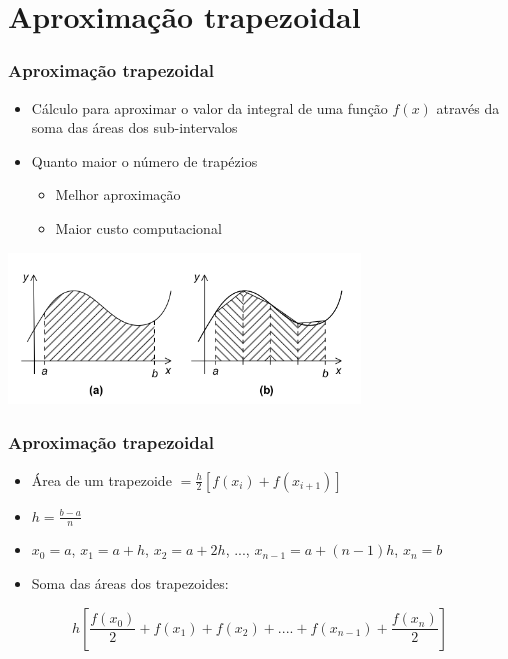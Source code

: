 \documentclass[xcolor={usenames,dvipsnames},12pt,presentation,aspectratio=169]{beamer}
\begin{document}
\section{Aproximação trapezoidal}
\begin{frame}
  \frametitle{Aproximação trapezoidal}
  \begin{itemize}
    \item Cálculo para aproximar o valor da integral de uma função $f(x)$ através da soma das áreas dos sub-intervalos
    \item Quanto maior o número de trapézios
    \begin{itemize}
      \item Melhor aproximação
      \item Maior custo computacional
    \end{itemize}
  \end{itemize}
  \begin{center}
    \includegraphics[width=0.7\textwidth]{trap.png}
    \end{center}  
\end{frame}
\begin{frame}
  \frametitle{Aproximação trapezoidal}
  \begin{itemize}
    \item Área de um trapezoide $= \frac{h}{2}[f(x_i)+f(x_{i+1})]$
    \item $h = \frac{b-a}{n}$
    \item $x_0 = a$, $x_1 = a+h$, $x_2 = a+2h$, ..., $x_{n-1} = a+(n-1)h$, $x_n=b$
    \item Soma das áreas dos trapezoides:
  \end{itemize} 
  \begin{equation*}
    h[\frac{f(x_0)}{2}+f(x_1)+f(x_2)+....+f(x_{n-1})+\frac{f(x_n)}{2}]
  \end{equation*}
\end{frame}
\end{document}
